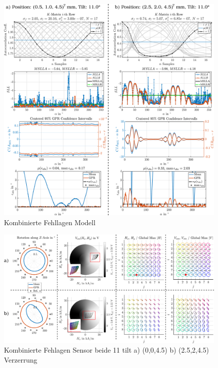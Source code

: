 \begin{figure}[tbph]
	\centering
	\includegraphics[width=\linewidth]{appendix/images/8-Ergebnisse-Experimente/Kombinierte-Fehllagen-GPR}
	\caption[Kombinierte Fehllagen Modell]{Kombinierte Fehllagen Modell}
	\label{fig:kombinierte-fehllagen-gpr}
\end{figure}



\begin{figure}[tbph]
	\centering
	\includegraphics[width=\linewidth]{appendix/images/8-Ergebnisse-Experimente/Kombinierte-Fehllagen-Sensor}
	\caption[Kombinierte Fehlagen Sensor]{Kombinierte Fehlagen Sensor beide 11 tilt a) (0,0,4.5) b) (2.5,2,4.5) Verzerrung}
	\label{fig:kombinierte-fehllagen-sensor}
\end{figure}



